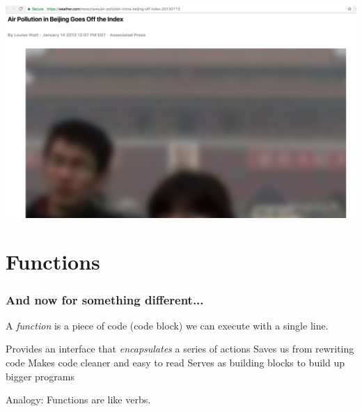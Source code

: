 \documentclass[11pt]{beamer}
\begin{document}
\begin{frame}
  \begin{center}
  \vspace{3mm}
  \includegraphics[width=1.3\textwidth]{./img/outofindex}\\
  \end{center}
\end{frame}


\section{Functions}

\begin{frame}
  \frametitle{And now for something different...}
  \Enlarge

  \begin{itemize}
  \myitem  A \emph{function} is a piece of code (code block) we can execute with a single line. \pause
    \begin{itemize}
    \mysubitem  Provides an interface that \emph{encapsulates} a series of actions \pause
    \mysubitem  Saves us from rewriting code \pause
    \mysubitem  Makes code cleaner and easy to read \pause
    \mysubitem  Serves as building blocks to build up bigger programs
    \end{itemize} \pause
  \myitem  Analogy:  Functions are like verbs.
  \end{itemize}
\end{frame}
\end{document}
